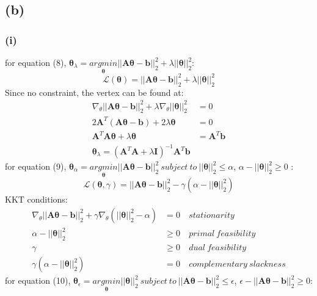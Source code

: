 \documentclass[11pt]{article}
\begin{document}
\subsection*{(b)}
\subsubsection*{(i)}
for equation (8), $\pmb{\theta}_\lambda=\underset{\pmb{\theta}}{argmin}||\pmb{A\theta}-\pmb{b}||^2_2+\lambda||\pmb{\theta}||^2_2$:\\
\begin{equation}
\mathcal{L}(\pmb{\theta})=||\pmb{A\theta}-\pmb{b}||^2_2+\lambda||\pmb{\theta}||^2_2
\end{equation}
Since no constraint, the vertex can be found at:
\begin{equation}
\begin{split}
\nabla_\theta||\pmb{A\theta}-\pmb{b}||^2_2+\lambda\nabla_\theta||\pmb{\theta}||^2_2&=0\\
2\pmb{A}^T(\pmb{A\theta}-\pmb{b})+2\lambda\pmb{\theta}&=0\\
\pmb{A}^T\pmb{A\theta}+\lambda\pmb{\theta}&=\pmb{A}^T\pmb{b}\\
\pmb{\theta}_\lambda=(\pmb{A}^T\pmb{A}+\lambda\pmb{I})^{-1}\pmb{A}^T\pmb{b}
\end{split}
\end{equation}
for equation (9), $\pmb{\theta}_\alpha=\underset{\pmb{\theta}}{argmin}||\pmb{A\theta}-\pmb{b}||^2_2 \ subject\ to\ ||\pmb{\theta}||^2_2\le\alpha$, $\alpha-||\pmb{\theta}||^2_2\ge 0$ :
\begin{equation}
\mathcal{L}(\pmb{\theta},\gamma)=||\pmb{A\theta}-\pmb{b}||^2_2-\gamma(\alpha-||\pmb{\theta}||^2_2)
\end{equation}
KKT conditions:\\
\begin{equation}
\begin{aligned}
\nabla_\theta||\pmb{A\theta}-\pmb{b}||^2_2+\gamma\nabla_\theta(||\pmb{\theta}||^2_2-\alpha)&=0 &\ stationarity\\
\alpha-||\pmb{\theta}||^2_2&\ge 0 &\ primal\ feasibility\\
\gamma&\ge 0 &\ dual\ feasibility\\
\gamma(\alpha-||\pmb{\theta}||^2_2)&=0 &\ complementary\ slackness
\end{aligned}
\end{equation}
for equation (10),
$\pmb{\theta}_\epsilon=\underset{\pmb{\theta}}{argmin}||\pmb{\theta}||^2_2\ subject\ to\ ||\pmb{A\theta}-\pmb{b}||^2_2\le\epsilon$, $\epsilon-||\pmb{A\theta}-\pmb{b}||^2_2\ge 0$:
\end{document}
